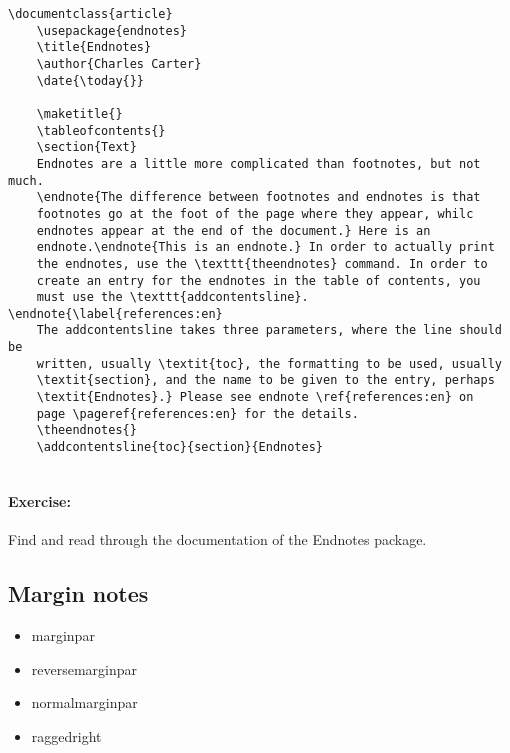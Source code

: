         \begin{verbatim}
\documentclass{article}
    \usepackage{endnotes}
    \title{Endnotes}
    \author{Charles Carter}
    \date{\today{}}
 
    \maketitle{}
    \tableofcontents{}
    \section{Text}
    Endnotes are a little more complicated than footnotes, but not much.
    \endnote{The difference between footnotes and endnotes is that 
    footnotes go at the foot of the page where they appear, whilc 
    endnotes appear at the end of the document.} Here is an 
    endnote.\endnote{This is an endnote.} In order to actually print 
    the endnotes, use the \texttt{theendnotes} command. In order to 
    create an entry for the endnotes in the table of contents, you 
    must use the \texttt{addcontentsline}.  \endnote{\label{references:en}
    The addcontentsline takes three parameters, where the line should be 
    written, usually \textit{toc}, the formatting to be used, usually 
    \textit{section}, and the name to be given to the entry, perhaps 
    \textit{Endnotes}.} Please see endnote \ref{references:en} on 
    page \pageref{references:en} for the details.
    \theendnotes{}
    \addcontentsline{toc}{section}{Endnotes}
    
        \end{verbatim}

        \paragraph{Exercise:} Find and read through the documentation of the Endnotes package.

    \subsection{Margin notes}
    \label{Margin notes}

        \begin{framed}
            \begin{itemize}
                \item{marginpar}
                \item{reversemarginpar}
                \item{normalmarginpar}
                \item{raggedright}
            \end{itemize}
        \end{framed}


